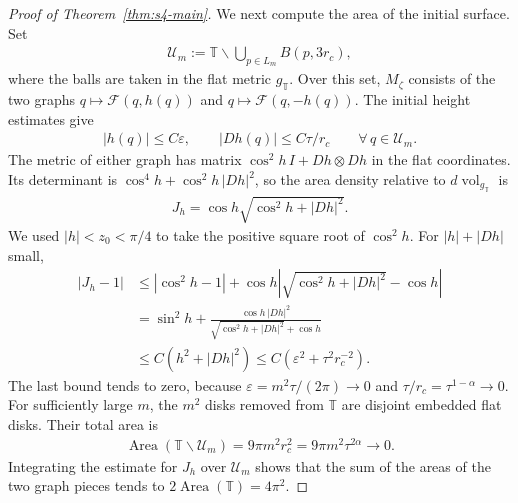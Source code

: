\documentclass[a4paper,11pt,oneside,reqno]{amsart}
\numberwithin{equation}{section}
\theoremstyle{definition}
\begin{document}
\begin{proof}[Proof of Theorem~\ref{thm:s4-main}]
    We next compute the area of the initial surface. Set
    \begin{align*}
        \mathcal U_m
        :=\mathbb T\smallsetminus\bigcup_{p\in L_m}B(p,3r_c),
    \end{align*}
    where the balls are taken in the flat metric
    $g_{\mathbb T}$. Over this set, $M_\zeta$ consists of
    the two graphs $q\mapsto\mathcal F(q,h(q))$ and
    $q\mapsto\mathcal F(q,-h(q))$. The initial height
    estimates give
    \begin{align*}
        |h(q)|\leq C\varepsilon,
        \qquad |Dh(q)|\leq C\tau/r_c
        \qquad\forall\,q\in\mathcal U_m.
    \end{align*}
    The metric of either graph has matrix
    $\cos^2h\,I+Dh\otimes Dh$ in the flat coordinates.
    Its determinant is
    $\cos^4h+\cos^2h\,|Dh|^2$, so the area density
    relative to $d\operatorname{vol}_{g_{\mathbb T}}$ is
    \begin{align*}
        J_h=\cos h\sqrt{\cos^2h+|Dh|^2}.
    \end{align*}
    We used $|h|<z_0<\pi/4$ to take the positive square
    root of $\cos^2h$. For $|h|+|Dh|$ small,
    \begin{align*}
        |J_h-1|
        &\leq|\cos^2h-1|
             +\cos h\left|\sqrt{\cos^2h+|Dh|^2}-\cos h\right|\\
        &=\sin^2h+
          \frac{\cos h\,|Dh|^2}
               {\sqrt{\cos^2h+|Dh|^2}+\cos h}\\
        &\leq C(h^2+|Dh|^2)
         \leq C(\varepsilon^2+\tau^2r_c^{-2}).
    \end{align*}
    The last bound tends to zero, because
    $\varepsilon=m^2\tau/(2\pi)\to0$ and
    $\tau/r_c=\tau^{1-\alpha}\to0$.
    For sufficiently large $m$, the $m^2$ disks removed
    from $\mathbb T$ are disjoint embedded flat disks.
    Their total area is
    \begin{align*}
        \operatorname{Area}(\mathbb T\smallsetminus\mathcal U_m)
        =9\pi m^2r_c^2=9\pi m^2\tau^{2\alpha}
        \rightarrow0.
    \end{align*}
    Integrating the estimate for $J_h$ over $\mathcal U_m$
    shows that the sum of the areas of the two graph pieces
    tends to $2\operatorname{Area}(\mathbb T)=4\pi^2$.


\end{proof}
\end{document}
